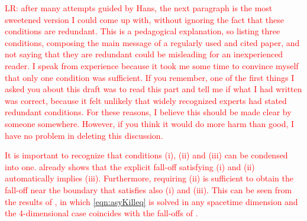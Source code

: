 \documentclass[a4paper,11pt]{article}
\numberwithin{equation}{section}
\begin{document}
\textcolor{red}{LR: after many attempts guided by Hans, the next paragraph is the most sweetened version I could come up with, without ignoring the fact that these conditions are redundant. This is a pedagogical explanation, so listing three conditions, composing the main message of a regularly used and cited paper, and not saying that they are redundant could be misleading for an inexperienced reader. I speak from experience because it took me some time to convince myself that only one condition was sufficient. If you remember, one of the first things I asked you about this draft was to read this part and tell me if what I had written was correct, because it felt unlikely that widely recognized experts had stated redundant conditions. For these reasons, I believe this should be made clear by someone somewhere. However, if you think it would do more harm than good, I have no problem in deleting this discussion.}

\textcolor{red}{It is important to recognize that conditions (i), (ii) and (iii) can be condensed into one. \cite{Henneaux:1985tv} already shows that the explicit fall-off satisfying (i) and (ii) automatically implies (iii). Furthermore, requiring (ii) is sufficient to obtain the fall-off near the boundary that satisfies also (i) and (iii). This can be seen from the results of \cite{Henneaux:2006hk}, in which \eqref{eqn:asyKilleq} is solved in any spacetime dimension and the 4-dimensional case coincides with the fall-offs of \cite{Henneaux:1985tv}.}

\end{document}
